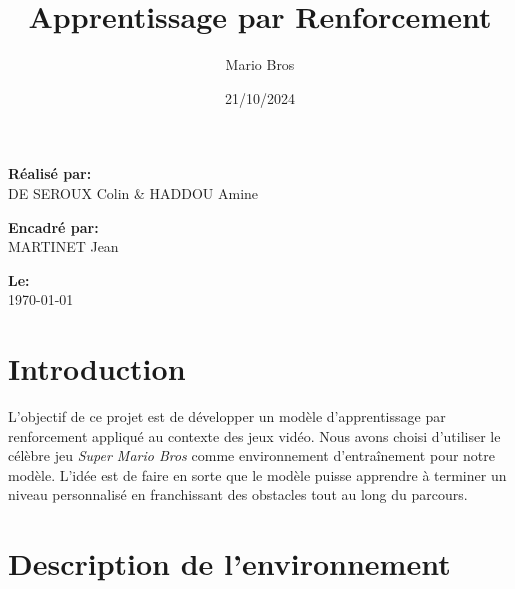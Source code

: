 \documentclass[a4paper,12pt]{article}
\begin{document}
\begin{titlepage}
\begin{center}
            \textbf{Réalisé par:} \\
            DE SEROUX Colin \& HADDOU Amine   \\
            
            \vspace{0.8cm}
            
            \textbf{Encadré par:} \\
            MARTINET Jean\\
            
            \vspace{1.5cm}
            
            \textbf{Le:} \\
            \today
            
        \end{center}
    \end{titlepage}
    
    \title{\huge\bf Apprentissage par Renforcement}
    \date{21/10/2024}
    \author{Mario Bros} 
    
    \newpage
    
    \maketitle
    
    \tableofcontents
    
    \newpage
    
    \maketitle
    
    \section{Introduction}
    
        L'objectif de ce projet est de développer un modèle d'apprentissage par renforcement appliqué au contexte des jeux vidéo. Nous avons choisi d'utiliser le célèbre jeu \textit{Super Mario Bros} comme environnement d'entraînement pour notre modèle. L'idée est de faire en sorte que le modèle puisse apprendre à terminer un niveau personnalisé en franchissant des obstacles tout au long du parcours.
    
    \section{Description de l'environnement}
    
\end{document}
